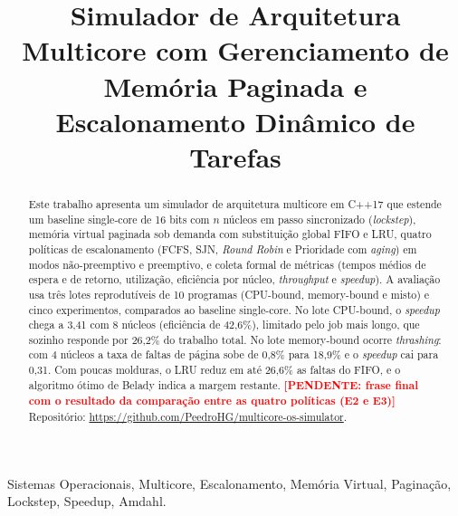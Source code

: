 \documentclass[conference]{IEEEtran}
\newcommand{\pendente}[1]{\textcolor{red}{\textbf{[PENDENTE: #1]}}}
\begin{document}
\title{Simulador de Arquitetura Multicore com Gerenciamento de Memória Paginada e Escalonamento Dinâmico de Tarefas}

\author{
    \and
    \and
    \and
}

\maketitle

\begin{abstract}
Este trabalho apresenta um simulador de arquitetura multicore em C++17 que estende um baseline single-core de 16 bits com $n$ núcleos em passo sincronizado (\textit{lockstep}), memória virtual paginada sob demanda com substituição global FIFO e LRU, quatro políticas de escalonamento (FCFS, SJN, \textit{Round Robin} e Prioridade com \textit{aging}) em modos não-preemptivo e preemptivo, e coleta formal de métricas (tempos médios de espera e de retorno, utilização, eficiência por núcleo, \textit{throughput} e \textit{speedup}). A avaliação usa três lotes reprodutíveis de 10 programas (CPU-bound, memory-bound e misto) e cinco experimentos, comparados ao baseline single-core. No lote CPU-bound, o \textit{speedup} chega a 3,41 com 8 núcleos (eficiência de 42,6\%), limitado pelo job mais longo, que sozinho responde por 26,2\% do trabalho total. No lote memory-bound ocorre \textit{thrashing}: com 4 núcleos a taxa de faltas de página sobe de 0,8\% para 18,9\% e o \textit{speedup} cai para 0,31. Com poucas molduras, o LRU reduz em até 26,6\% as faltas do FIFO, e o algoritmo ótimo de Belady indica a margem restante. \pendente{frase final com o resultado da comparação entre as quatro políticas (E2 e E3)} Repositório: \url{https://github.com/PeedroHG/multicore-os-simulator}.
\end{abstract}

\begin{IEEEkeywords}
Sistemas Operacionais, Multicore, Escalonamento, Memória Virtual, Paginação, Lockstep, Speedup, Amdahl.
\end{IEEEkeywords}
\end{document}
